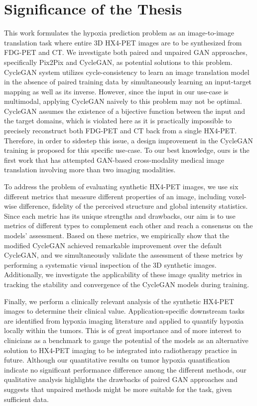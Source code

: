 \section{Significance of the Thesis}
This work formulates the hypoxia prediction problem as an image-to-image translation task where entire 3D HX4-PET images are to be synthesized from FDG-PET and CT. We investigate both paired and unpaired GAN approaches, specifically Pix2Pix and CycleGAN, as potential solutions to this problem. CycleGAN system utilizes cycle-consistency to learn an image translation model in the absence of paired training data by simultaneously learning an input-target mapping as well as its inverse. However, since the input in our use-case is multimodal, applying CycleGAN naively to this problem may not be optimal. CycleGAN assumes the existence of a bijective function between the input and the target domains, which is violated here as it is practically impossible to precisely reconstruct both FDG-PET and CT back from a single HX4-PET. Therefore, in order to sidestep this issue, a design improvement in the CycleGAN training is proposed for this specific use-case. To our best knowledge, ours is the first work that has attempted GAN-based cross-modality medical image translation involving more than two imaging modalities.

To address the problem of evaluating synthetic HX4-PET images, we use six different metrics that measure different properties of an image, including voxel-wise difference, fidelity of the perceived structure and global intensity statistics. Since each metric has its unique strengths and drawbacks, our aim is to use metrics of different types to complement each other and reach a consensus on the models' assessment. Based on these metrics, we empirically show that the modified CycleGAN achieved remarkable improvement over the default CycleGAN, and we simultaneously validate the assessment of these metrics by performing a systematic visual inspection of the 3D synthetic images. Additionally, we investigate the applicability of these image quality metrics in tracking the stability and convergence of the CycleGAN models during training.

Finally, we perform a clinically relevant analysis of the synthetic HX4-PET images to determine their clinical value. Application-specific downstream tasks are identified from hypoxia imaging literature and applied to quantify hypoxia locally within the tumors. This is of great importance and of more interest to clinicians as a benchmark to gauge the potential of the models as an alternative solution to HX4-PET imaging to be integrated into radiotherapy practice in future. Although our quantitative results on tumor hypoxia quantification indicate no significant performance difference among the different methods, our qualitative analysis highlights the drawbacks of paired GAN approaches and suggests that unpaired methods might be more suitable for the task, given sufficient data.



